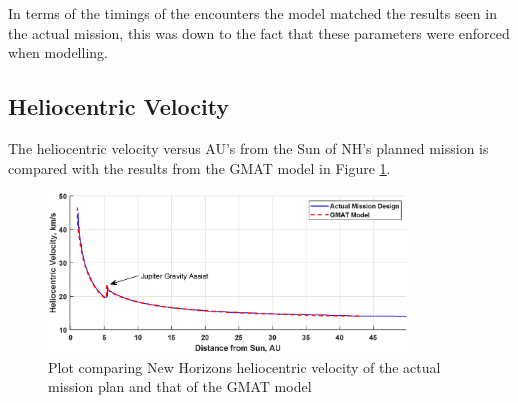 \documentclass[11pt]{article}
\begin{document}
In terms of the timings of the encounters the model matched the results seen in the actual mission, this was down to the fact that these parameters were enforced when modelling.

\subsection{Heliocentric Velocity}
The heliocentric velocity versus AU's from the Sun of NH's planned mission is compared with the results from the GMAT model in Figure \ref{fig:vel}.

\begin{figure}[H]
    \centering
    \includegraphics[width=0.85\textwidth]{vel2.eps}
    \caption{Plot comparing New Horizons heliocentric velocity of the actual mission plan and that of the GMAT model \cite{orig}}
    \label{fig:vel}
\end{figure}
\end{document}
